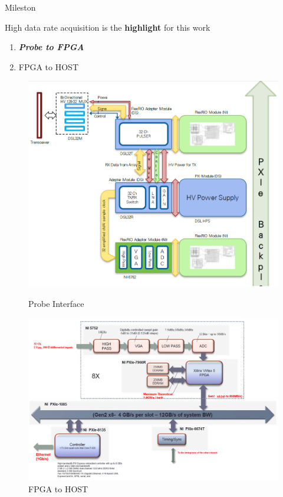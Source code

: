 \documentclass[t,12pt,english
\ifx\beamermode\undefined\else,\beamermode\fi
]{beamer}
\begin{document}
\begin{frame}{Mileston}

\begin{block}{\footnotesize{High data rate acquisition is the \textbf{highlight} for this work}}\tiny{}
\begin{enumerate} 
\vspace{0.05cm}
     \item \tiny{\textbf{\textit{Probe to FPGA}} } 
     \item \tiny{FPGA to HOST}
\end{enumerate}
\end{block}




\begin{figure}[!htb]
\includegraphics[width=.81\textwidth]{2.png}
\caption{\tiny{Probe Interface}}
\endminipage
{}
\centering
\includegraphics[width=1\textwidth]{4.png}
\caption{\tiny{FPGA to HOST} }
\endminipage
\end{figure}


\end{frame}
\end{document}
